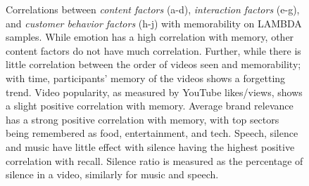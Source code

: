 \begin{landscape}
\begin{figure}[]
\begin{subfigure}{0.3\textwidth}
        \caption{}
        \label{subfig:recall by sector}
    \end{subfigure}
    \caption{Correlations between \textit{content factors} (a-d), \textit{interaction factors} (e-g), and \textit{customer behavior factors} (h-j) with memorability on LAMBDA samples. While emotion has a high correlation with memory, other content factors do not have much correlation. Further, while there is little correlation between the order of videos seen and memorability; with time, participants' memory of the videos shows a forgetting trend. Video popularity, as measured by YouTube likes/views, shows a slight positive correlation with memory. Average brand relevance has a strong positive correlation with memory, with top sectors being remembered as food, entertainment, and tech. Speech, silence and music have little effect with silence having the highest positive correlation with recall. Silence ratio is measured as the percentage of silence in a video, similarly for music and speech.}
    \label{fig:correlation-graphs}
\end{figure}
\end{landscape}










